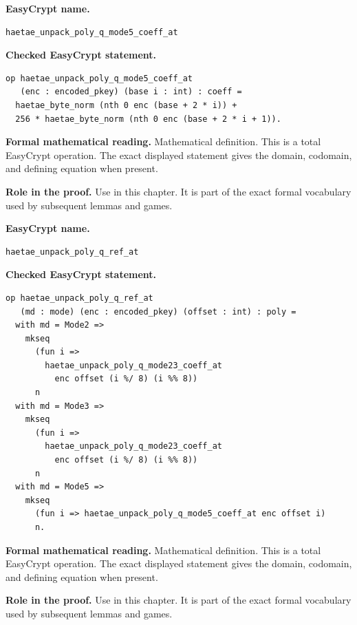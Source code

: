 \begin{formaldefinition}
\noindent\textbf{EasyCrypt name.}
\begin{lstlisting}[language=EasyCrypt,basicstyle=\ttfamily\scriptsize]
haetae_unpack_poly_q_mode5_coeff_at
\end{lstlisting}
\noindent\textbf{Checked EasyCrypt statement.}
\begin{lstlisting}[language=EasyCrypt,basicstyle=\ttfamily\scriptsize]
op haetae_unpack_poly_q_mode5_coeff_at
   (enc : encoded_pkey) (base i : int) : coeff =
  haetae_byte_norm (nth 0 enc (base + 2 * i)) +
  256 * haetae_byte_norm (nth 0 enc (base + 2 * i + 1)).
\end{lstlisting}
\noindent\textbf{Formal mathematical reading.}
Mathematical definition. This is a total EasyCrypt operation.  The exact displayed statement gives the domain, codomain, and defining equation when present.

\noindent\textbf{Role in the proof.}
Use in this chapter. It is part of the exact formal vocabulary used by subsequent lemmas and games.

\end{formaldefinition}

\begin{formaldefinition}
\noindent\textbf{EasyCrypt name.}
\begin{lstlisting}[language=EasyCrypt,basicstyle=\ttfamily\scriptsize]
haetae_unpack_poly_q_ref_at
\end{lstlisting}
\noindent\textbf{Checked EasyCrypt statement.}
\begin{lstlisting}[language=EasyCrypt,basicstyle=\ttfamily\scriptsize]
op haetae_unpack_poly_q_ref_at
   (md : mode) (enc : encoded_pkey) (offset : int) : poly =
  with md = Mode2 =>
    mkseq
      (fun i =>
        haetae_unpack_poly_q_mode23_coeff_at
          enc offset (i %/ 8) (i %% 8))
      n
  with md = Mode3 =>
    mkseq
      (fun i =>
        haetae_unpack_poly_q_mode23_coeff_at
          enc offset (i %/ 8) (i %% 8))
      n
  with md = Mode5 =>
    mkseq
      (fun i => haetae_unpack_poly_q_mode5_coeff_at enc offset i)
      n.
\end{lstlisting}
\noindent\textbf{Formal mathematical reading.}
Mathematical definition. This is a total EasyCrypt operation.  The exact displayed statement gives the domain, codomain, and defining equation when present.

\noindent\textbf{Role in the proof.}
Use in this chapter. It is part of the exact formal vocabulary used by subsequent lemmas and games.

\end{formaldefinition}

